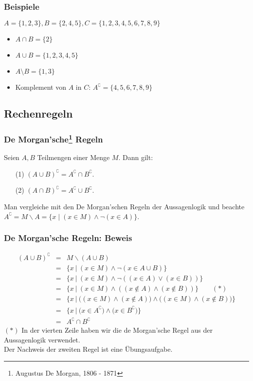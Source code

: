 %
%
\begin{frame}\frametitle{Beispiele}
	
$A=\{1,2,3\}, B=\{2,4,5\}, C=\{1,2,3,4,5,6,7,8,9\}$
\vfill
\begin{itemize}
\item $A\cap B=\{2\}$ \pause
\item $A\cup B =\{1,2,3,4,5\}$ \pause
\item $ A \setminus B=\{1,3\}$ \pause
\item Komplement von $A$ in $C$: $A^{\complement}=\{4,5,6,7,8,9\}$
\end{itemize}
\end{frame}
%

\subsection{Rechenregeln}
%
\begin{frame}\frametitle{De Morgan'sche\footnote{Augustus De Morgan, 1806 - 1871} Regeln}
	
	Seien $A,B$ Teilmengen einer Menge $M$. Dann gilt:
	\begin{itemize}
		\item[(1)] $(A \cup B)^\complement = A^\complement \cap B^\complement.$
		\item[(2)] $(A \cap B)^\complement = A^\complement \cup B^\complement.$
	\end{itemize}
	\vfill
	 Man vergleiche mit den De Morgan'schen Regeln der Aussagenlogik und beachte $A^\complement = M\backslash A = \{x\mid (x\in M) \land \neg (x \in A)\}$.
\end{frame}
%
%
\begin{frame}\frametitle{De Morgan'sche Regeln: Beweis}
	
	\vspace{-3mm}
	\begin{eqnarray*}
		(A \cup B)^\complement  	&=& M \backslash (A\cup B) \\
						&=& \{x ~|~ (x\in M) \land \neg(x \in A\cup B) \}\\
						&=& \{x ~|~ (x\in M) \land \neg( (x \in A) \lor (x\in B) ) \}\\
						&=& \{x ~|~ (x\in M) \land ( (x \notin A) \land (x \notin B) ) \}	\qquad (*)\\ 		
						&=& \{x ~|~ \big((x\in M) \land (x \notin A)\big) \land \big( (x \in M) \land (x \notin B) \big) \}	\\
						&=& \{x ~|~ \big( x\in A^\complement \big) \land \big( x\in B^\complement \big) \}\\
						&=& A^\complement \cap B^\complement
	\end{eqnarray*}
	$(*)$ In der vierten Zeile haben wir die de Morgan'sche Regel aus der Aussagenlogik verwendet.\\
	\vfill \pause
	Der Nachweis der zweiten Regel ist eine \"Ubungsaufgabe.
	
\end{frame}
